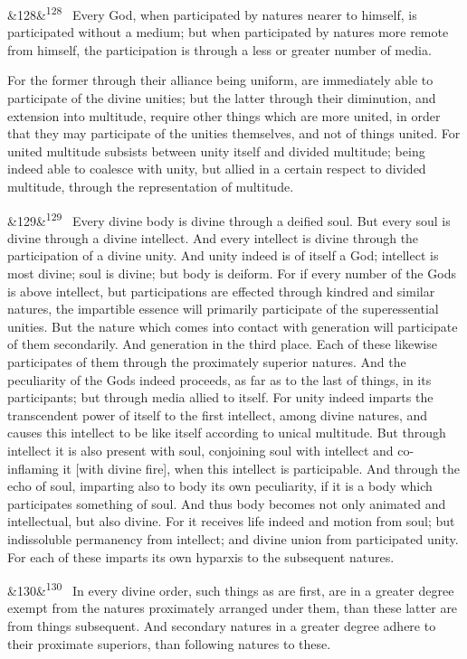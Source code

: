 \documentclass[12pt]{article}
\newcommand{\para}[1][]{\par\noindent\ifx&#1&\else\textsuperscript{\footnotesize #1}~\fi}
\begin{document}
\para[128] Every God, when participated by natures nearer to himself, is participated without a medium; but when participated by natures more remote from himself, the participation is through a less or greater number of media.

For the former through their alliance being uniform, are immediately able to participate of the divine unities; but the latter through their diminution, and extension into multitude, require other things which are more united, in order that they may participate of the unities themselves, and not of things united. For united multitude subsists between unity itself and divided multitude; being indeed able to coalesce with unity, but allied in a certain respect to divided multitude, through the representation of multitude.

\para[129] Every divine body is divine through a deified soul. But every soul is divine through a divine intellect. And every intellect is divine through the participation of a divine unity. And unity indeed is of itself a God; intellect is most divine; soul is divine; but body is deiform. For if every number of the Gods is above intellect, but participations are effected through kindred and similar natures, the impartible essence will primarily participate of the superessential unities. But the nature which comes into contact with generation will participate of them secondarily. And generation in the third place. Each of these likewise participates of them through the proximately superior natures. And the peculiarity of the Gods indeed proceeds, as far as to the last of things, in its participants; but through media allied to itself. For unity indeed imparts the transcendent power of itself to the first intellect, among divine natures, and causes this intellect to be like itself according to unical multitude. But through intellect it is also present with soul, conjoining soul with intellect and co-inflaming it [with divine fire], when this intellect is participable. And through the echo of soul, imparting also to body its own peculiarity, if it is a body which participates something of soul. And thus body becomes not only animated and intellectual, but also divine. For it receives life indeed and motion from soul; but indissoluble permanency from intellect; and divine union from participated unity. For each of these imparts its own hyparxis to the subsequent natures.

\para[130] In every divine order, such things as are first, are in a greater degree exempt from the natures proximately arranged under them, than these latter are from things subsequent. And secondary natures in a greater degree adhere to their proximate superiors, than following natures to these.
\end{document}
